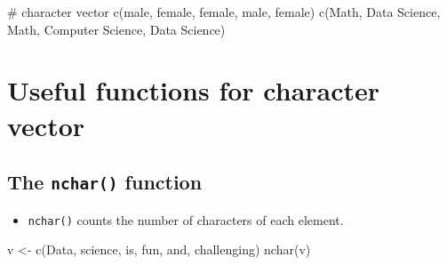 \documentclass[
  letterpaper,
  DIV=11,
  numbers=noendperiod]{scrreprt}
\newenvironment{Shaded}{\begin{snugshade}}{\end{snugshade}}
\newcommand{\CommentTok}[1]{\textcolor[rgb]{0.37,0.37,0.37}{#1}}
\newcommand{\FunctionTok}[1]{\textcolor[rgb]{0.28,0.35,0.67}{#1}}
\newcommand{\NormalTok}[1]{\textcolor[rgb]{0.00,0.23,0.31}{#1}}
\newcommand{\OtherTok}[1]{\textcolor[rgb]{0.00,0.23,0.31}{#1}}
\newcommand{\StringTok}[1]{\textcolor[rgb]{0.13,0.47,0.30}{#1}}
\providecommand{\tightlist}{%
  \setlength{\itemsep}{0pt}\setlength{\parskip}{0pt}}\usepackage{longtable,booktabs,array}
\begin{document}
\begin{Shaded}
\begin{Highlighting}[]
\CommentTok{\# character vector}
\FunctionTok{c}\NormalTok{(}\StringTok{\textquotesingle{}male\textquotesingle{}}\NormalTok{, }\StringTok{\textquotesingle{}female\textquotesingle{}}\NormalTok{, }\StringTok{\textquotesingle{}female\textquotesingle{}}\NormalTok{, }\StringTok{\textquotesingle{}male\textquotesingle{}}\NormalTok{, }\StringTok{\textquotesingle{}female\textquotesingle{}}\NormalTok{)  }
\FunctionTok{c}\NormalTok{(}\StringTok{\textquotesingle{}Math\textquotesingle{}}\NormalTok{, }\StringTok{\textquotesingle{}Data Science\textquotesingle{}}\NormalTok{, }\StringTok{\textquotesingle{}Math\textquotesingle{}}\NormalTok{, }\StringTok{\textquotesingle{}Computer Science\textquotesingle{}}\NormalTok{, }\StringTok{\textquotesingle{}Data Science\textquotesingle{}}\NormalTok{)  }
\end{Highlighting}
\end{Shaded}

\section{Useful functions for character
vector}\label{useful-functions-for-character-vector}

\subsection{\texorpdfstring{The \texttt{nchar()}
function}{The nchar() function}}\label{the-nchar-function}

\begin{itemize}
\tightlist
\item
  \texttt{nchar()} counts the number of characters of each element.
\end{itemize}

\begin{Shaded}
\begin{Highlighting}[]
\NormalTok{v }\OtherTok{\textless{}{-}} \FunctionTok{c}\NormalTok{(}\StringTok{\textquotesingle{}Data\textquotesingle{}}\NormalTok{, }\StringTok{\textquotesingle{}science\textquotesingle{}}\NormalTok{, }\StringTok{\textquotesingle{}is\textquotesingle{}}\NormalTok{, }\StringTok{\textquotesingle{}fun\textquotesingle{}}\NormalTok{, }\StringTok{\textquotesingle{}and\textquotesingle{}}\NormalTok{, }\StringTok{\textquotesingle{}challenging\textquotesingle{}}\NormalTok{)}
\FunctionTok{nchar}\NormalTok{(v)}
\end{Highlighting}
\end{Shaded}
\end{document}
